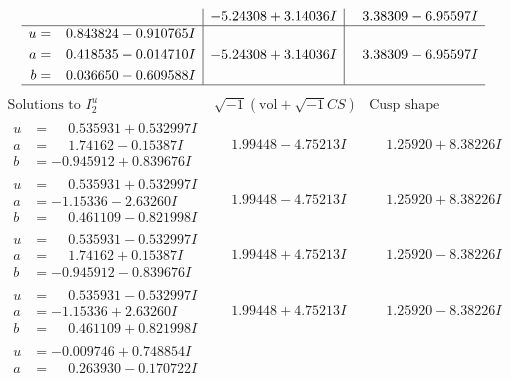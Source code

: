 \documentclass[1p]{elsarticle_modified}
\theoremstyle{definition}
\newcommand{\I}{\sqrt{-1}}
\begin{document}
$$\begin{array}{c|c|c}
 & -5.24308 + 3.14036 I & \phantom{-}3.38309 - 6.95597 I \\ \hline\begin{aligned}
u &= \phantom{-}0.843824 - 0.910765 I \\
a &= \phantom{-}0.418535 - 0.014710 I \\
b &= \phantom{-}0.036650 - 0.609588 I\end{aligned}
 & -5.24308 + 3.14036 I & \phantom{-}3.38309 - 6.95597 I\\
 \hline 
 \end{array}$$\newpage$$\begin{array}{c|c|c}  
\text{Solutions to }I^u_{2}& \I (\text{vol} + \sqrt{-1}CS) & \text{Cusp shape}\\
 \hline 
\begin{aligned}
u &= \phantom{-}0.535931 + 0.532997 I \\
a &= \phantom{-}1.74162 - 0.15387 I \\
b &= -0.945912 + 0.839676 I\end{aligned}
 & \phantom{-}1.99448 - 4.75213 I & \phantom{-}1.25920 + 8.38226 I \\ \hline\begin{aligned}
u &= \phantom{-}0.535931 + 0.532997 I \\
a &= -1.15336 - 2.63260 I \\
b &= \phantom{-}0.461109 - 0.821998 I\end{aligned}
 & \phantom{-}1.99448 - 4.75213 I & \phantom{-}1.25920 + 8.38226 I \\ \hline\begin{aligned}
u &= \phantom{-}0.535931 - 0.532997 I \\
a &= \phantom{-}1.74162 + 0.15387 I \\
b &= -0.945912 - 0.839676 I\end{aligned}
 & \phantom{-}1.99448 + 4.75213 I & \phantom{-}1.25920 - 8.38226 I \\ \hline\begin{aligned}
u &= \phantom{-}0.535931 - 0.532997 I \\
a &= -1.15336 + 2.63260 I \\
b &= \phantom{-}0.461109 + 0.821998 I\end{aligned}
 & \phantom{-}1.99448 + 4.75213 I & \phantom{-}1.25920 - 8.38226 I \\ \hline\begin{aligned}
u &= -0.009746 + 0.748854 I \\
a &= \phantom{-}0.263930 - 0.170722 I \\

\end{aligned}
\end{array}$$
\end{document}
